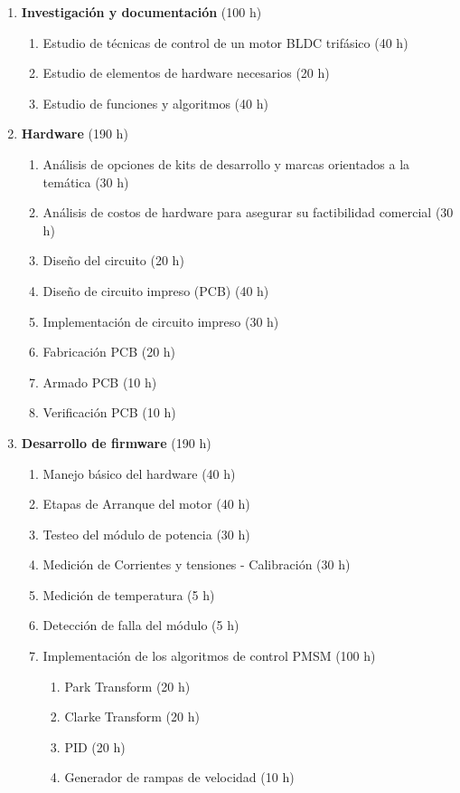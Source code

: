 \documentclass[
11pt, %
codirector, %
]{charter}
\begin{document}
\begin{enumerate}

	\item \textbf{Investigación y documentación} (100 h)
	      \begin{enumerate}
		      \item Estudio de técnicas de control de un motor BLDC trifásico (40 h)
		      \item Estudio de elementos de hardware necesarios (20 h)
		      \item Estudio de funciones y algoritmos (40 h)
	      \end{enumerate}

	\item \textbf{Hardware} (190 h)
	      \begin{enumerate}
		      \item Análisis de opciones de kits de desarrollo y marcas orientados a la temática (30 h)
		      \item Análisis de costos de hardware para asegurar su factibilidad comercial (30 h)
		      \item Diseño del circuito (20 h)
		      \item Diseño de circuito impreso (PCB) (40 h)
		      \item Implementación de circuito impreso (30 h)
		      \item Fabricación PCB (20 h)
		      \item Armado PCB (10 h)
		      \item Verificación PCB (10 h)
	      \end{enumerate}

	\item \textbf{Desarrollo de firmware} (190 h)
	      \begin{enumerate}
		      \item Manejo básico del hardware (40 h)
		      \item Etapas de Arranque del motor (40 h)
		      \item Testeo del módulo de potencia (30 h)
		      \item Medición de Corrientes y tensiones - Calibración (30 h)
		      \item Medición de temperatura (5 h)
		      \item Detección de falla del módulo (5 h)
		      \item Implementación de los algoritmos de control PMSM (100 h)
		            \begin{enumerate}
			            \item Park Transform (20 h)
			            \item Clarke Transform (20 h)
			            \item PID (20 h)
			            \item Generador de rampas de velocidad (10 h)
		            \end{enumerate}
	      \end{enumerate}


\end{enumerate}
\end{document}
